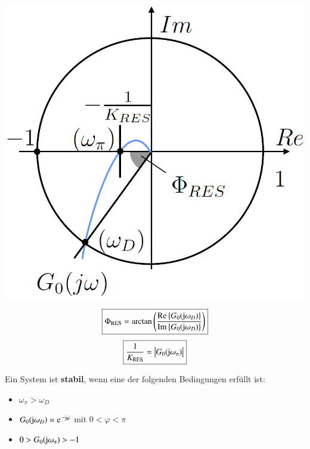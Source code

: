 \begin{minipage}[c]{0.48\columnwidth}
    \includegraphics[width=\columnwidth]{images/stabilitaetsreserven_1.png}
\end{minipage}
\hfill
\begin{minipage}[c]{0.5\columnwidth}

    $$ \boxed{\Phi_{\rm RES} = \arctan \left( \frac{\operatorname{Re}\left\{G_{0}(\mathrm{j} \omega_{D})\right\}}{\operatorname{Im}\left\{G_{0}(\mathrm{j} \omega_{D})\right\}} \right) } $$
    $$ \boxed{\frac{1}{K_{\rm RES}} = \big| G_{0}(\mathrm{j} \omega_{\pi}) \big| } $$


     Ein System ist \textbf{stabil}, wenn eine der folgenden Bedingungen erfüllt ist:
     \vspace{0.2cm}

     \begin{itemize}
        \setlength\itemsep{4pt}
        \item $\omega_{\pi} > \omega_{D}$
        \item $G_{0}(\jimg \omega_{D}) = \e^{- \jimg \varphi}$ \quad mit $0 < \varphi < \pi$
        \item $0 > G_{0}(\mathrm{j} \omega_{\pi}) > -1 $
     \end{itemize}
\end{minipage}

\vspace{0.2cm}

